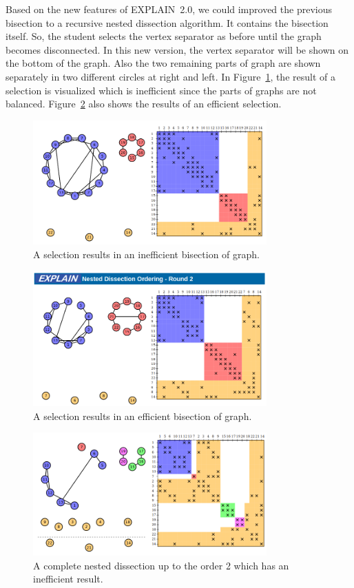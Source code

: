\documentclass[11pt, twoside,a4paper]{book}
\begin{document}
Based on the new features of \mbox{EXPLAIN 2.0}, we could improved the previous
bisection to a recursive nested dissection algorithm.
It contains the bisection itself. So, the student selects the vertex separator
as before until the graph becomes disconnected.
In this new version, the vertex separator will be shown on the bottom
of the graph. Also the two remaining parts of graph are shown separately
in two different circles at right and left.
In Figure~\ref{bad_bisection}, the result of a selection is visualized which
is inefficient since the parts of graphs are not balanced.
Figure~\ref{good_bisection} also shows the results of an efficient selection.

\begin{figure}
\centering
\includegraphics[width=0.8\textwidth]{bad_bisection}
\caption{A selection results in an inefficient bisection of graph.}
\label{bad_bisection}
\end{figure}

\begin{figure}
\centering
\includegraphics[width=0.8\textwidth]{good_bisection}
\caption{A selection results in an efficient bisection of graph.}
\label{good_bisection}
\end{figure}

\begin{figure}
\centering
\includegraphics[width=0.8\textwidth]{bad_disection}
\caption{A complete nested dissection up to the order 2 which has an
inefficient result.}
\label{bad_disection}
\end{figure}
\end{document}
